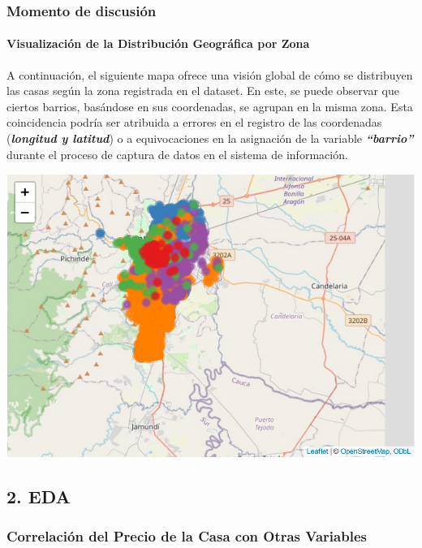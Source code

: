 \documentclass[
]{article}
\begin{document}
\subsubsection{\texorpdfstring{\textbf{Momento de
discusión}}{Momento de discusión}}\label{momento-de-discusiuxf3n}

\paragraph{\texorpdfstring{\textbf{Visualización de la Distribución
Geográfica por
Zona}}{Visualización de la Distribución Geográfica por Zona}}\label{visualizaciuxf3n-de-la-distribuciuxf3n-geogruxe1fica-por-zona}

A continuación, el siguiente mapa ofrece una visión global de cómo se
distribuyen las casas según la zona registrada en el dataset. En este,
se puede observar que ciertos barrios, basándose en sus coordenadas, se
agrupan en la misma zona. Esta coincidencia podría ser atribuida a
errores en el registro de las coordenadas (\textbf{\emph{longitud y
latitud}}) o a equivocaciones en la asignación de la variable
\textbf{\emph{``barrio''}} durante el proceso de captura de datos en el
sistema de información.

\includegraphics{A2_U2_InformeEjecutivo_files/figure-latex/unnamed-chunk-12-1.pdf}

\subsection{\texorpdfstring{\textbf{2. EDA}}{2. EDA}}\label{eda}

\subsubsection{Correlación del Precio de la Casa con Otras
Variables}\label{correlaciuxf3n-del-precio-de-la-casa-con-otras-variables}
\end{document}
